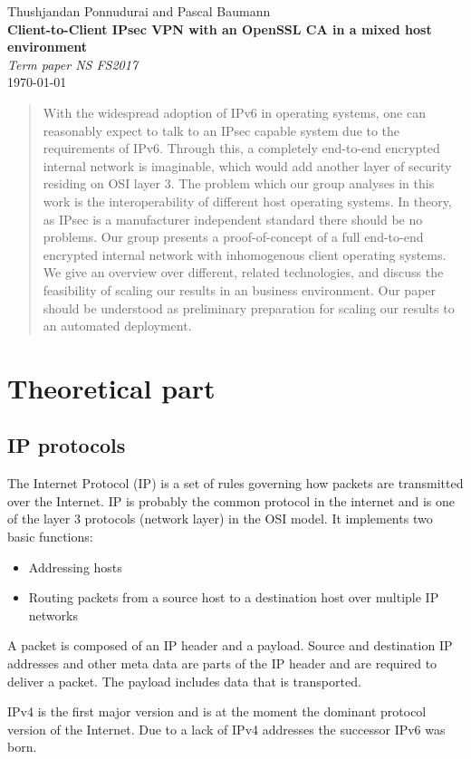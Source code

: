 \documentclass[a4paper]{report}
\newcommand*{\titleAP}{\begingroup %
	\centering
	\vspace*{\baselineskip} %
	
	{\Large Thushjandan Ponnudurai} and {\Large Pascal Baumann}\\[0.167\textheight] %
	
	{\Huge\bfseries Client-to-Client IPsec VPN with an OpenSSL CA in a mixed host environment}\\[\baselineskip]
	
	{\Large \textit{Term paper NS FS2017}}\\
	\today
	
	\vspace*{3\baselineskip} %
	\endgroup}
\begin{document}
\titleAP

\newpage

\begin{abstract}
	With the widespread adoption of IPv6 in operating systems, one can reasonably expect to talk to an IPsec capable system due to the requirements of IPv6. Through this, a completely end-to-end encrypted internal network is imaginable, which would add another layer of security residing on OSI layer 3.
	The problem which our group analyses in this work is the interoperability of different host operating systems. In theory, as IPsec is a manufacturer independent standard there should be no problems. Our group presents a proof-of-concept of a full end-to-end encrypted internal network with inhomogenous client operating systems. We give an overview over different, related technologies, and discuss the feasibility of scaling our results in an business environment.
	Our paper should be understood as preliminary preparation for scaling our results to an automated deployment.
\end{abstract}

\tableofcontents

\newpage

\chapter{Theoretical part}
\label{ch:Theory}

\section{IP protocols}
\label{sec:IPprot}
The Internet Protocol (IP) is a set of rules governing how packets are transmitted over the Internet. IP is probably the common protocol in the internet and is one of the layer 3 protocols (network layer) in the OSI model. It implements two basic functions:
\begin{itemize}
	\item Addressing hosts
	\item Routing packets from a source host to a destination host over multiple IP networks
\end{itemize}
A packet is composed of an IP header and a payload. Source and destination IP addresses and other meta data are parts of the IP header and are required to deliver a packet. The payload includes data that is transported.

IPv4 is the first major version and is at the moment the dominant protocol version of the Internet. Due to a lack of IPv4 addresses the successor IPv6 was born. \parencite{NadeemUnuth2016}
\end{document}
